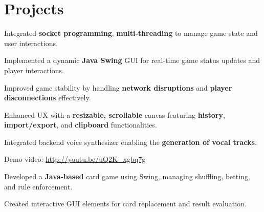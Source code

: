 \documentclass[a4paper,10pt]{article}
\begin{document}
\section{Projects}

\begin{tightitemize}
  \item Integrated \textbf{socket programming}, \textbf{multi-threading} to manage game state and user interactions.
  \item Implemented a dynamic \textbf{Java Swing} GUI for real-time game status updates and player interactions.
  \item Improved game stability by handling \textbf{network disruptions} and \textbf{player disconnections} effectively.
\end{tightitemize}

\begin{tightitemize}
  \item Enhanced UX with a \textbf{resizable, scrollable} canvas featuring \textbf{history}, \textbf{import/export}, and \textbf{clipboard} functionalities.
  \item Integrated backend voice synthesizer enabling the \textbf{generation of vocal tracks}.
  \item Demo video: \href{http://youtu.be/uQ2K\_xgbq7g}{\underline{http://youtu.be/uQ2K\_xgbq7g}}
\end{tightitemize}

\begin{tightitemize}
  \item Developed a \textbf{Java-based} card game using Swing, managing shuffling, betting, and rule enforcement.
  \item Created interactive GUI elements for card replacement and result evaluation.
\end{tightitemize}
\end{document}
